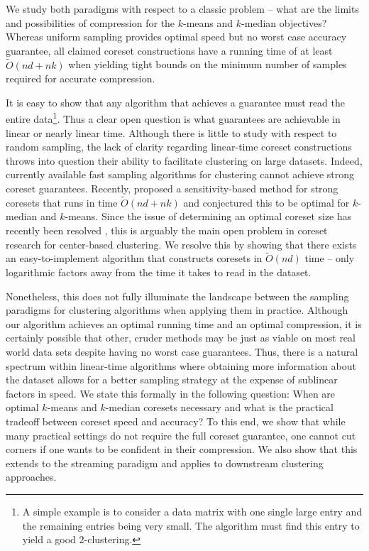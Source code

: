 We study both paradigms with respect to a classic problem -- what are the limits and possibilities of compression for the $k$-means and $k$-median objectives?
Whereas uniform sampling provides optimal speed but no worst case accuracy guarantee, all claimed coreset constructions have a running time of at least $\tilde{O}(nd+nk)$ when yielding tight bounds on the
minimum number of samples required for accurate compression. 

It is easy to show that any algorithm that achieves a guarantee must read the entire data\footnote{A simple example is to consider a data matrix with one single large entry and the remaining entries being very small. The algorithm must find this entry to yield a good 2-clustering.}. Thus a clear open question is what guarantees are achievable in linear or nearly linear time.
Although there is little to study with respect to random sampling, the lack of clarity regarding
linear-time coreset constructions throws into question their ability to facilitate clustering on large datasets. Indeed, currently available fast sampling
algorithms for clustering \cite{BachemL018} \cite{kmeans_sublinear_bachem16} cannot achieve strong coreset guarantees.  Recently, \cite{DSWY22} proposed
a sensitivity-based method for strong coresets that runs in time $\tilde{O}(nd + nk)$ and conjectured this to be optimal for $k$-median and $k$-means.  Since
the issue of determining an optimal coreset size has recently been resolved \cite{CSS21,CLSSS22,HLW23}, this is arguably the main open problem in coreset
research for center-based clustering. We resolve this by showing that there exists an easy-to-implement algorithm that constructs coresets in $\tilde{O}(nd)$
time -- only logarithmic factors away from the time it takes to read in the dataset.

Nonetheless, this does not fully illuminate the landscape between the sampling paradigms for clustering algorithms when applying them in practice. Although our
algorithm achieves an optimal running time and an optimal compression, it is certainly possible that other, cruder methods may be just as viable on most real world data sets despite
having no worst case guarantees.  Thus, there is a natural spectrum within linear-time algorithms where obtaining more information about the dataset allows for
a better sampling strategy at the expense of sublinear factors in speed. We state this formally in the following question: When are optimal $k$-means and
$k$-median coresets necessary and what is the practical tradeoff between coreset speed and accuracy? To this end, we show that while many practical settings do
not require the full coreset guarantee, one cannot cut corners if one wants to be confident in their compression. We also show that this extends to the
streaming paradigm and applies to downstream clustering approaches.

